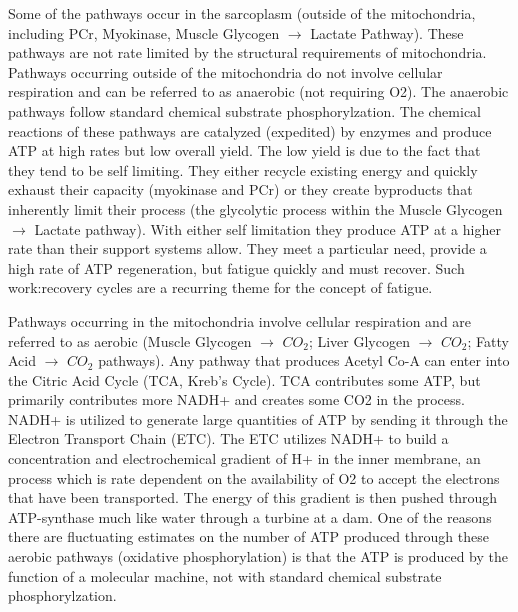 Some of the pathways occur in the sarcoplasm (outside of the mitochondria, including PCr, Myokinase, Muscle Glycogen $\rightarrow$ Lactate Pathway). These pathways are not rate limited by the structural requirements of mitochondria.  Pathways occurring outside of the mitochondria do not involve cellular respiration and can be referred to as anaerobic (not requiring O2). The anaerobic pathways follow standard chemical substrate phosphorylzation. The chemical reactions of these pathways are catalyzed (expedited) by enzymes and produce ATP at high rates but low overall yield. The low yield is due to the fact that they tend to be self limiting. They either recycle existing energy and quickly exhaust their capacity (myokinase and PCr) or they create byproducts that inherently limit their process (the glycolytic process within the Muscle Glycogen $\rightarrow$ Lactate pathway). With either self limitation they produce ATP at a higher rate than their support systems allow. They meet a particular need, provide a high rate of ATP regeneration, but fatigue quickly and must recover. Such work:recovery cycles are a recurring theme for the concept of fatigue.

Pathways occurring in the mitochondria involve cellular respiration and are referred to as aerobic (Muscle Glycogen $\rightarrow$ $CO_2$; Liver Glycogen $\rightarrow$ $CO_2$; Fatty Acid $\rightarrow$ $CO_2$ pathways). Any pathway that produces Acetyl Co-A can enter into the Citric Acid Cycle (TCA, Kreb's Cycle). TCA contributes some ATP, but primarily contributes more NADH+ and creates some CO2 in the process. NADH+ is utilized to generate large quantities of ATP by sending it through the Electron Transport Chain (ETC). The ETC utilizes NADH+ to build a concentration and electrochemical gradient of H+ in the inner membrane, an process which is rate dependent on the availability of O2 to accept the electrons that have been transported. The energy of this gradient is then pushed through ATP-synthase much like water through a turbine at a dam. One of the reasons there are fluctuating estimates on the number of ATP produced through these aerobic pathways (oxidative phosphorylation) is that the ATP is produced by the function of a molecular machine, not with standard chemical substrate phosphorylzation. 


